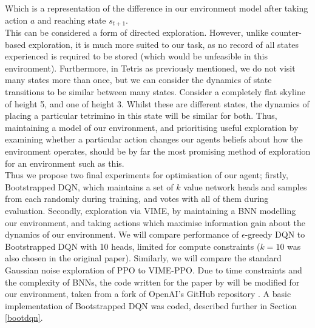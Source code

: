 \documentclass[12pt]{article}
\begin{document}
Which is a representation of the difference in our environment model after taking action $a$ and reaching state $s_{t+1}$.\\\newline
This can be considered a form of directed exploration. However, unlike counter-based exploration, it is much more suited to our task, as no record of all states experienced is required to be stored (which would be unfeasible in this environment). Furthermore, in Tetris as previously mentioned, we do not visit many states more than once, but we can consider the dynamics of state transitions to be similar between many states. Consider a completely flat skyline of height 5, and one of height 3. Whilst these are different states, the dynamics of placing a particular tetrimino in this state will be similar for both. Thus, maintaining a model of our environment, and prioritising useful exploration by examining whether a particular action changes our agents beliefs about how the environment operates, should be by far the most promising method of exploration for an environment such as this. \\\newline
Thus we propose two final experiments for optimisation of our agent; firstly, Bootstrapped DQN, which maintains a set of $k$ value network heads and samples from each randomly during training, and votes with all of them during evaluation. Secondly, exploration via VIME, by maintaining a BNN modelling our environment, and taking actions which maximise information gain about the dynamics of our environment. We will compare performance of $\epsilon$-greedy DQN to  Bootstrapped DQN with 10 heads, limited for compute constraints ($k=10$ was also chosen in the original paper). Similarly, we will compare the standard Gaussian noise exploration of PPO to VIME-PPO. Due to time constraints and the complexity of BNNs, the code written for the paper by \textcite{houthooft2016vime} will be modified for our environment, taken from a fork of OpenAI's GitHub repository \autocite{vimerepo,Mazzaglia_VIME_Variational_Information_2020}. A basic implementation of Bootstrapped DQN was coded, described further in Section \ref{bootdqn}. 
\end{document}
